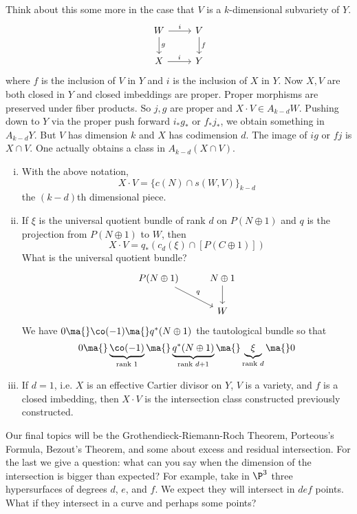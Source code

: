 Think about this some more in the case that $V$ is a $k$-dimensional subvariety of $Y$.
	\[
	\begin{tikzcd}
	W \arrow{r}{i} \arrow{d}{g} & V \arrow{d}{f} \\ X \arrow{r}{i} & Y
	\end{tikzcd}
	\]
where $f$ is the inclusion of $V$ in $Y$ and $i$ is the inclusion of $X$ in $Y$. Now $X,V$ are both closed in $Y$ and closed imbeddings are proper. Proper morphisms are preserved under fiber products. So $j,g$ are proper and $X \cdot V \in A_{k-d}W$. Pushing down to $Y$ via the proper push forward $i_*g_*$ or $f_*j_*$, we obtain something in $A_{k-d}Y$. But $V$ has dimension $k$ and $X$ has codimension $d$. The image of $ig$ or $fj$ is $X \cap V$. One actually obtains a class in $A_{k-d}(X \cap V)$. 

\begin{prop} \hfill
\begin{enumerate}[(i)]
\item With the above notation, 
	\[
	X \cdot V = \{c(N) \cap s(W,V) \}_{k-d}
	\]
the $(k-d)$th dimensional piece. 
\item If $\xi$ is the universal quotient bundle of rank $d$ on $P(N \oplus 1)$ and $q$ is the projection from $P(N \oplus 1)$ to $W$, then 
	\[
	X \cdot V= q_*\left(c_d(\xi) \cap [P(C \oplus 1)]\right)
	\]
What is the universal quotient bundle?
	\[
	\begin{tikzcd}
	P(N \oplus 1) \arrow{dr}{q} & N \oplus 1 \arrow{d} \\
	& W
	\end{tikzcd}
	\]
We have $0 \ma{} \co(-1) \ma{} q^*(N \oplus 1)$ the tautological bundle so that 
	\[
	0 \ma{} \underbrace{\co(-1)}_{\text{rank }1} \ma{} \underbrace{q^*(N \oplus 1)}_{\text{rank } d+1}  \ma{} \underbrace{\xi}_{\text{rank }d} \ma{} 0
	\]
\item If $d=1$, i.e. $X$ is an effective Cartier divisor on $Y$, $V$ is a variety, and $f$ is a closed imbedding, then $X \cdot V$ is the intersection class constructed previously constructed. 
\end{enumerate}
\end{prop}



Our final topics will be the Grothendieck-Riemann-Roch Theorem, Porteous's Formula, Bezout's Theorem, and some about excess and residual intersection. For the last we give a question: what can you say when the dimension of the intersection is bigger than expected? For example, take in $\P^3$ three hypersurfaces of degrees $d$, $e$, and $f$. We expect they will intersect in $def$ points. What if they intersect in a curve and perhaps some points?

